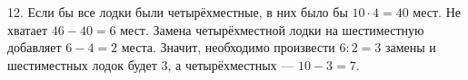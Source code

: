 12. Если бы все лодки были четырёхместные, в них было бы $10\cdot4=40$ мест. Не хватает $46-40=6$ мест. Замена четырёхместной лодки на шестиместную
добавляет $6-4=2$ места. Значит, необходимо произвести $6:2=3$ замены и шестиместных лодок будет 3, а четырёхместных --- $10-3=7.$\\
